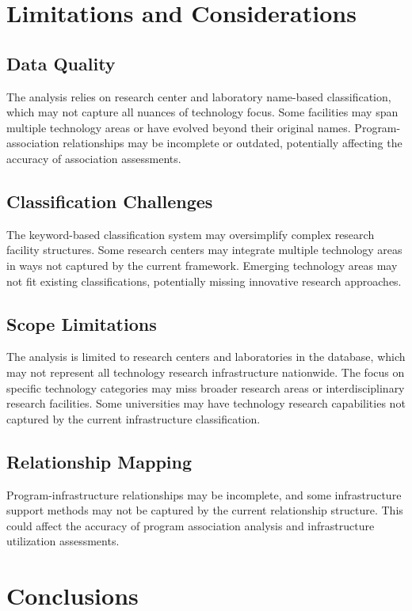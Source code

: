 \documentclass[12pt]{article}
\begin{document}
\section{Limitations and Considerations}

\subsection{Data Quality}
The analysis relies on research center and laboratory name-based classification, which may not capture all nuances of technology focus. Some facilities may span multiple technology areas or have evolved beyond their original names. Program-association relationships may be incomplete or outdated, potentially affecting the accuracy of association assessments.

\subsection{Classification Challenges}
The keyword-based classification system may oversimplify complex research facility structures. Some research centers may integrate multiple technology areas in ways not captured by the current framework. Emerging technology areas may not fit existing classifications, potentially missing innovative research approaches.

\subsection{Scope Limitations}
The analysis is limited to research centers and laboratories in the database, which may not represent all technology research infrastructure nationwide. The focus on specific technology categories may miss broader research areas or interdisciplinary research facilities. Some universities may have technology research capabilities not captured by the current infrastructure classification.

\subsection{Relationship Mapping}
Program-infrastructure relationships may be incomplete, and some infrastructure support methods may not be captured by the current relationship structure. This could affect the accuracy of program association analysis and infrastructure utilization assessments.

\section{Conclusions}
\end{document}
